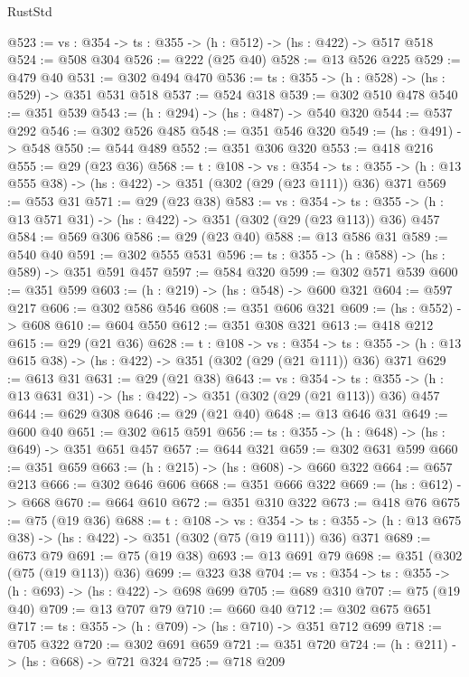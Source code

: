 \begin{lexlean}{RustStd}
\begin{coremodule}
@523 := {vs : @354} -> {ts : @355} -> (h : @512) -> (hs : @422) -> @517 @518
@524 := @508 @304
@526 := @222 (@25 @40)
@528 := @13 @526 @225
@529 := @479 @40
@531 := @302 @494 @470
@536 := {ts : @355} -> (h : @528) -> (hs : @529) -> @351 @531 @518
@537 := @524 @318
@539 := @302 @510 @478
@540 := @351 @539
@543 := (h : @294) -> (hs : @487) -> @540 @320
@544 := @537 @292
@546 := @302 @526 @485
@548 := @351 @546 @320
@549 := (hs : @491) -> @548
@550 := @544 @489
@552 := @351 @306 @320
@553 := @418 @216
@555 := @29 (@23 @36)
@568 := {t : @108} ->
  {vs : @354} ->
  {ts : @355} -> (h : @13 @555 @38) -> (hs : @422) -> @351 (@302 (@29 (@23 @111)) @36) @371
@569 := @553 @31
@571 := @29 (@23 @38)
@583 := {vs : @354} ->
  {ts : @355} -> (h : @13 @571 @31) -> (hs : @422) -> @351 (@302 (@29 (@23 @113)) @36) @457
@584 := @569 @306
@586 := @29 (@23 @40)
@588 := @13 @586 @31
@589 := @540 @40
@591 := @302 @555 @531
@596 := {ts : @355} -> (h : @588) -> (hs : @589) -> @351 @591 @457
@597 := @584 @320
@599 := @302 @571 @539
@600 := @351 @599
@603 := (h : @219) -> (hs : @548) -> @600 @321
@604 := @597 @217
@606 := @302 @586 @546
@608 := @351 @606 @321
@609 := (hs : @552) -> @608
@610 := @604 @550
@612 := @351 @308 @321
@613 := @418 @212
@615 := @29 (@21 @36)
@628 := {t : @108} ->
  {vs : @354} ->
  {ts : @355} -> (h : @13 @615 @38) -> (hs : @422) -> @351 (@302 (@29 (@21 @111)) @36) @371
@629 := @613 @31
@631 := @29 (@21 @38)
@643 := {vs : @354} ->
  {ts : @355} -> (h : @13 @631 @31) -> (hs : @422) -> @351 (@302 (@29 (@21 @113)) @36) @457
@644 := @629 @308
@646 := @29 (@21 @40)
@648 := @13 @646 @31
@649 := @600 @40
@651 := @302 @615 @591
@656 := {ts : @355} -> (h : @648) -> (hs : @649) -> @351 @651 @457
@657 := @644 @321
@659 := @302 @631 @599
@660 := @351 @659
@663 := (h : @215) -> (hs : @608) -> @660 @322
@664 := @657 @213
@666 := @302 @646 @606
@668 := @351 @666 @322
@669 := (hs : @612) -> @668
@670 := @664 @610
@672 := @351 @310 @322
@673 := @418 @76
@675 := @75 (@19 @36)
@688 := {t : @108} ->
  {vs : @354} ->
  {ts : @355} -> (h : @13 @675 @38) -> (hs : @422) -> @351 (@302 (@75 (@19 @111)) @36) @371
@689 := @673 @79
@691 := @75 (@19 @38)
@693 := @13 @691 @79
@698 := @351 (@302 (@75 (@19 @113)) @36)
@699 := @323 @38
@704 := {vs : @354} -> {ts : @355} -> (h : @693) -> (hs : @422) -> @698 @699
@705 := @689 @310
@707 := @75 (@19 @40)
@709 := @13 @707 @79
@710 := @660 @40
@712 := @302 @675 @651
@717 := {ts : @355} -> (h : @709) -> (hs : @710) -> @351 @712 @699
@718 := @705 @322
@720 := @302 @691 @659
@721 := @351 @720
@724 := (h : @211) -> (hs : @668) -> @721 @324
@725 := @718 @209

\end{coremodule}
\end{lexlean}
